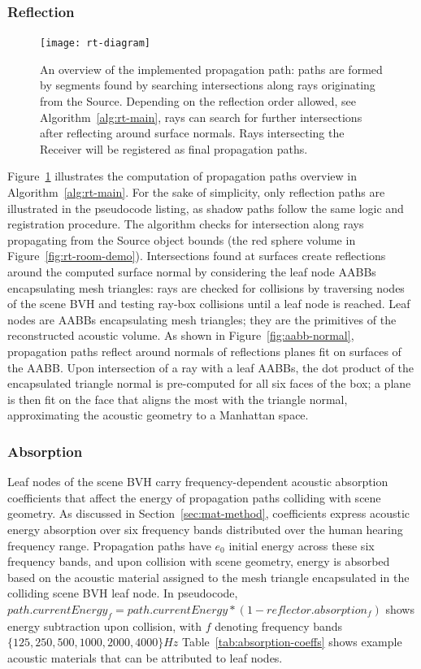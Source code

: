 \subsubsection{Reflection}
\begin{figure}[h]
    \centering
    \texttt{[image: rt-diagram]}
    \caption{An overview of the implemented propagation path: paths are formed by segments found by searching intersections along rays originating from the Source. Depending on the reflection order allowed, see Algorithm~\ref{alg:rt-main}, rays can search for further intersections after reflecting around surface normals. Rays intersecting the Receiver will be registered as final propagation paths.}
    \label{fig:rt-reflection-diagram}
\end{figure}
Figure~\ref{fig:rt-reflection-diagram} illustrates the computation of propagation paths overview in Algorithm~\ref{alg:rt-main}. For the sake of simplicity, only reflection paths are illustrated in the pseudocode listing, as shadow paths follow the same logic and registration procedure. The algorithm checks for intersection along rays propagating from the Source object bounds (the red sphere volume in Figure~\ref{fig:rt-room-demo}). Intersections found at surfaces create reflections around the computed surface normal by considering the leaf node AABBs encapsulating mesh triangles: rays are checked for collisions by traversing nodes of the scene BVH and testing ray-box collisions until a leaf node is reached. Leaf nodes are AABBs encapsulating mesh triangles; they are the primitives of the reconstructed acoustic volume. As shown in Figure~\ref{fig:aabb-normal}, propagation paths reflect around normals of reflections planes fit on surfaces of the AABB. Upon intersection of a ray with a leaf AABBs, the dot product of the encapsulated triangle normal is pre-computed for all six faces of the box; a plane is then fit on the face that aligns the most with the triangle normal, approximating the acoustic geometry to a Manhattan space. \par

\subsubsection{Absorption}
Leaf nodes of the scene BVH carry frequency-dependent acoustic absorption coefficients that affect the energy of propagation paths colliding with scene geometry. As discussed in Section~\ref{sec:mat-method}, coefficients express acoustic energy absorption over six frequency bands distributed over the human hearing frequency range. Propagation paths have $e_0$ initial energy across these six frequency bands, and upon collision with scene geometry, energy is absorbed based on the acoustic material assigned to the mesh triangle encapsulated in the colliding scene BVH leaf node. In pseudocode, $path.currentEnergy_f = path.currentEnergy * (1 - reflector.absorption_f)$ shows energy subtraction upon collision, with $f$ denoting frequency bands $\{ 125, 250, 500, 1000, 2000, 4000 \} Hz$ Table~\ref{tab:absorption-coeffs} shows example acoustic materials that can be attributed to leaf nodes. \par

